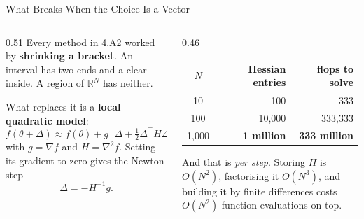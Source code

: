 \begin{frame}{What Breaks When the Choice Is a Vector}
\begin{columns}[T]
\begin{column}{0.51\textwidth}
\small
Every method in 4.A2 worked by \textbf{shrinking a bracket}. An interval has two ends and a clear inside. A region of $\mathbb{R}^{N}$ has neither.
\medskip

What replaces it is a \textbf{local quadratic model}:
\[
  f(\theta+\Delta)\approx f(\theta)+g^{\!\top}\!\Delta+\tfrac12\Delta^{\!\top} H\Delta,
\]
with $g=\nabla f$ and $H=\nabla^{2}f$. Setting its gradient to zero gives the Newton step
\[
  \Delta=-H^{-1}g .
\]
\end{column}
\begin{column}{0.46\textwidth}
\begin{center}\footnotesize
\begin{tabularx}{\linewidth}{@{}c r r@{}}
\toprule
$N$ & \textbf{Hessian entries} & \textbf{flops to solve} \\
\midrule
10 & 100 & 333 \\
100 & 10{,}000 & 333{,}333 \\
1{,}000 & \textbf{1 million} & \textbf{333 million} \\
\bottomrule
\end{tabularx}
\end{center}
\vspace{1mm}
\begin{cautionbox}\footnotesize
And that is \emph{per step}. Storing $H$ is $O(N^{2})$, factorising it $O(N^{3})$, and building it by finite differences costs $O(N^{2})$ function evaluations on top.
\end{cautionbox}
\end{column}
\end{columns}
\vspace{1mm}
\end{frame}

